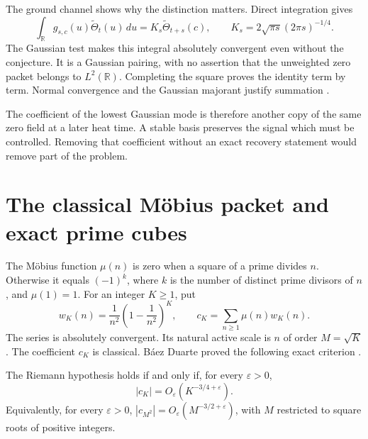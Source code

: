 
The ground channel shows why the distinction matters. Direct integration gives
\begin{equation}\label{rh:ground}
\int_{\mathbb R}g_{s,c}(u)\widetilde\Theta_t(u)\,du
=K_s\widetilde\Theta_{t+s}(c),
\qquad K_s=2\sqrt{\pi s}(2\pi s)^{-1/4}.
\end{equation}
The Gaussian test makes this integral absolutely convergent even without the conjecture. It is a Gaussian pairing, with no assertion that the unweighted zero packet belongs to \(L^2(\mathbb R)\). Completing the square proves the identity term by term. Normal convergence and the Gaussian majorant justify summation \cite{KomorebiGround}.

The coefficient of the lowest Gaussian mode is therefore another copy of the same zero field at a later heat time. A stable basis preserves the signal which must be controlled. Removing that coefficient without an exact recovery statement would remove part of the problem.

\section{The classical Möbius packet and exact prime cubes}

The Möbius function \(\mu(n)\) is zero when a square of a prime divides \(n\). Otherwise it equals \((-1)^k\), where \(k\) is the number of distinct prime divisors of \(n\), and \(\mu(1)=1\). For an integer \(K\ge1\), put
\begin{equation}\label{rh:w}
w_K(n)=\frac1{n^2}\left(1-\frac1{n^2}\right)^K,
\qquad c_K=\sum_{n\ge1}\mu(n)w_K(n).
\end{equation}
The series is absolutely convergent. Its natural active scale is \(n\) of order \(M=\sqrt K\). The coefficient \(c_K\) is classical. Báez Duarte proved the following exact criterion \cite{BaezDuarte}.

\begin{theorem}\label{rh:bd}
The Riemann hypothesis holds if and only if, for every \(\varepsilon>0\),
\begin{equation}\label{rh:bdcriterion}
|c_K|=O_\varepsilon(K^{-3/4+\varepsilon}).
\end{equation}
Equivalently, for every \(\varepsilon>0\),
\(|c_{M^2}|=O_\varepsilon(M^{-3/2+\varepsilon})\), with \(M\) restricted to square roots of positive integers.
\end{theorem}

